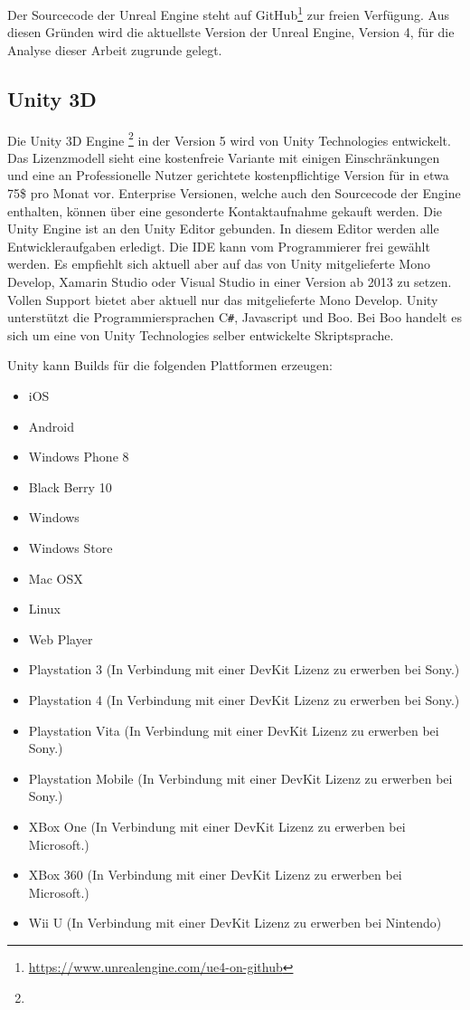 \documentclass[pagesize, paper=a4, fontsize=12pt,titlepage=true, headings=small, headnosepline, abstractoff, liststotoc, nochapterprefix, plainheadsepline, twoside]{scrreprt}
\newcommand{\CS}{C\texttt{\#}}
\begin{document}
Der Sourcecode der Unreal Engine steht auf GitHub\footnote{\url{https://www.unrealengine.com/ue4-on-github}} zur freien Verfügung. Aus diesen Gründen wird die aktuellste Version der Unreal Engine, Version 4, für die Analyse dieser Arbeit zugrunde gelegt.

\subsection{Unity 3D}
Die Unity 3D Engine \footnote{} in der Version 5 wird von Unity Technologies entwickelt. Das Lizenzmodell sieht eine kostenfreie Variante mit einigen Einschränkungen und eine an Professionelle Nutzer gerichtete kostenpflichtige Version für in etwa 75\$ pro Monat vor. Enterprise Versionen, welche auch den Sourcecode der Engine enthalten, können über eine gesonderte Kontaktaufnahme gekauft werden. Die Unity Engine ist an den Unity Editor gebunden. In diesem Editor werden alle Entwickleraufgaben erledigt. Die IDE kann vom Programmierer frei gewählt werden. Es empfiehlt sich aktuell aber auf das von Unity mitgelieferte Mono Develop, Xamarin Studio oder Visual Studio in einer Version ab 2013 zu setzen. Vollen Support bietet aber aktuell nur das mitgelieferte Mono Develop. Unity unterstützt die Programmiersprachen \CS, Javascript und Boo. Bei Boo handelt es sich um eine von Unity Technologies selber entwickelte Skriptsprache.

Unity kann Builds für die folgenden Plattformen erzeugen:
\begin{itemize}
\item iOS
\item Android
\item Windows Phone 8
\item Black Berry 10
\item Windows
\item Windows Store
\item Mac OSX
\item Linux
\item Web Player
\item Playstation 3 (In Verbindung mit einer DevKit Lizenz zu erwerben bei Sony.)
\item Playstation 4 (In Verbindung mit einer DevKit Lizenz zu erwerben bei Sony.)
\item Playstation Vita (In Verbindung mit einer DevKit Lizenz zu erwerben bei Sony.)
\item Playstation Mobile (In Verbindung mit einer DevKit Lizenz zu erwerben bei Sony.)
\item XBox One (In Verbindung mit einer DevKit Lizenz zu erwerben bei Microsoft.)
\item XBox 360 (In Verbindung mit einer DevKit Lizenz zu erwerben bei Microsoft.)
\item Wii U  (In Verbindung mit einer DevKit Lizenz zu erwerben bei Nintendo)
\end{itemize}
\end{document}
